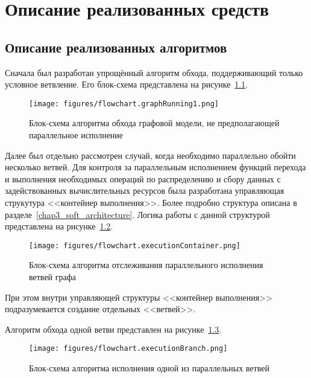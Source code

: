 \chapter{Описание реализованных средств}\label{chap4_soft_testing}
\section{Описание реализованных алгоритмов}\label{sec:algorithm_desc}

Сначала был разработан упрощённый алгоритм обхода, поддерживающий только условное ветвление. Его блок-схема представлена на рисунке~\ref{fig:flowchartNoBranching}.
\begin{figure}[!ht]
    \centering
    \texttt{[image: figures/flowchart.graphRunning1.png]}
    \caption{Блок-схема алгоритма обхода графовой модели, не предполагающей параллельное исполнение}
    \label{fig:flowchartNoBranching}
\end{figure}

Далее был отдельно рассмотрен случай, когда необходимо параллельно обойти несколько ветвей. Для контроля за параллельным исполнением функций перехода и выполнения необходимых операций по распределению и сбору данных с задействованных вычислительных ресурсов была разработана управляющая струкутура <<контейнер выполнения>>. Более подробно структура описана в разделе~\ref{chap3_soft_architecture}. Логика работы с данной структурой представлена на рисунке~\ref{fig:flowchartExecutionContainer}.
\begin{figure}[H]
    \centering
    \texttt{[image: figures/flowchart.executionContainer.png]}
    \caption{Блок-схема алгоритма отслеживания параллельного исполнения ветвей графа}
    \label{fig:flowchartExecutionContainer}
\end{figure}

При этом внутри управляющей структуры <<контейнер выполнения>> подразумевается создание отдельных <<ветвей>>.

Алгоритм обхода одной ветви представлен на рисунке~\ref{fig:flowchartExecutionBranch}.

\begin{figure}[H]
    \centering
    \texttt{[image: figures/flowchart.executionBranch.png]}
    \caption{Блок-схема алгоритма исполнения одной из параллельных ветвей}
    \label{fig:flowchartExecutionBranch}
\end{figure}

